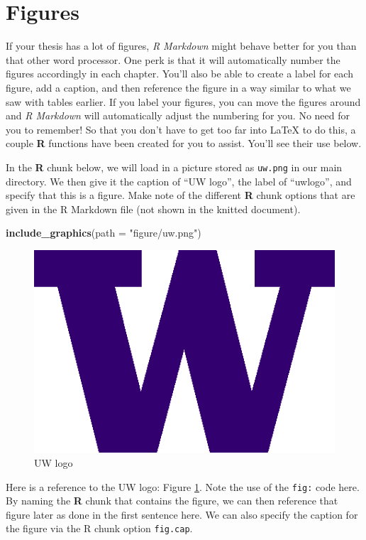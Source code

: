 \documentclass [11pt, proquest] {uwthesis}[2015/03/03]
\newenvironment{Shaded}{}{}
\newcommand{\KeywordTok}[1]{\textcolor[rgb]{0.00,0.44,0.13}{\textbf{{#1}}}}
\newcommand{\DataTypeTok}[1]{\textcolor[rgb]{0.56,0.13,0.00}{{#1}}}
\newcommand{\StringTok}[1]{\textcolor[rgb]{0.25,0.44,0.63}{{#1}}}
\newcommand{\NormalTok}[1]{{#1}}
\begin{document}
\clearpage

\section{Figures}\label{figures}

If your thesis has a lot of figures, \emph{R Markdown} might behave
better for you than that other word processor. One perk is that it will
automatically number the figures accordingly in each chapter. You'll
also be able to create a label for each figure, add a caption, and then
reference the figure in a way similar to what we saw with tables
earlier. If you label your figures, you can move the figures around and
\emph{R Markdown} will automatically adjust the numbering for you. No
need for you to remember! So that you don't have to get too far into
LaTeX to do this, a couple \textbf{R} functions have been created for
you to assist. You'll see their use below.

In the \textbf{R} chunk below, we will load in a picture stored as
\texttt{uw.png} in our main directory. We then give it the caption of
``UW logo'', the label of ``uwlogo'', and specify that this is a figure.
Make note of the different \textbf{R} chunk options that are given in
the R Markdown file (not shown in the knitted document).
\begin{Shaded}
\begin{Highlighting}[]
\KeywordTok{include_graphics}\NormalTok{(}\DataTypeTok{path =} \StringTok{"figure/uw.png"}\NormalTok{)}
\end{Highlighting}
\end{Shaded}
\begin{figure}
\includegraphics[width=6.25in]{figure/uw} \caption{UW logo}\label{fig:uwlogo}
\end{figure}
Here is a reference to the UW logo: Figure \ref{fig:uwlogo}. Note the
use of the \texttt{fig:} code here. By naming the \textbf{R} chunk that
contains the figure, we can then reference that figure later as done in
the first sentence here. We can also specify the caption for the figure
via the R chunk option \texttt{fig.cap}.
\end{document}

